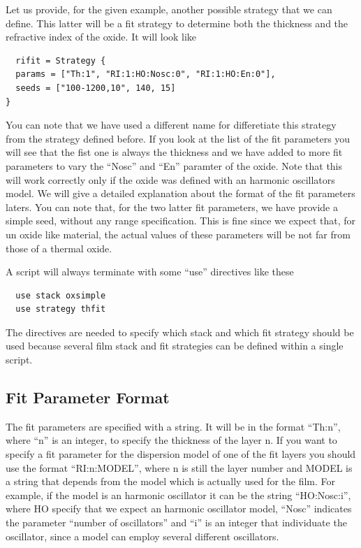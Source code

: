 \documentclass[a4paper]{report}
\begin{document}
Let us provide, for the given example, another possible strategy that
we can define. This latter will be a fit strategy to determine both
the thickness and the refractive index of the oxide. It will look like
\begin{verbatim}
  rifit = Strategy {
  params = ["Th:1", "RI:1:HO:Nosc:0", "RI:1:HO:En:0"],
  seeds = ["100-1200,10", 140, 15]
}
\end{verbatim}
You can note that we have used a different name for differetiate this
strategy from the strategy defined before. If you look at the list of
the fit parameters you will see that the fist one is always the
thickness and we have added to more fit parameters to vary the
``Nosc'' and ``En'' paramter of the oxide. Note that this will work
correctly only if the oxide was defined with an harmonic oscillators
model. We will give a detailed explanation about the format of the fit
parameters laters. You can note that, for the two latter fit
parameters, we have provide a simple seed, without any range
specification. This is fine since we expect that, for un oxide like
material, the actual values of these parameters will be not far from
those of a thermal oxide.

A script will always terminate with some ``use'' directives like these
\begin{verbatim}
  use stack oxsimple
  use strategy thfit
\end{verbatim}
The directives are needed to specify which stack and which fit
strategy should be used because several film stack and fit strategies
can be defined within a single script.

\subsection{Fit Parameter Format}
The fit parameters are specified with a string. It will be in the
format ``Th:n'', where ``n'' is an integer, to specify the thickness of
the layer n. If you want to specify a fit parameter for the dispersion
model of one of the fit layers you should use the format
``RI:n:MODEL'', where n is still the layer number and MODEL is a
string that depends from the model which is actually used for the
film. For example, if the model is an harmonic oscillator it can be
the string ``HO:Nosc:i'', where HO specify that we expect an harmonic
oscillator model, ``Nosc'' indicates the parameter ``number of
oscillators'' and ``i'' is an integer that individuate the oscillator,
since a model can employ several different oscillators.
\end{document}
